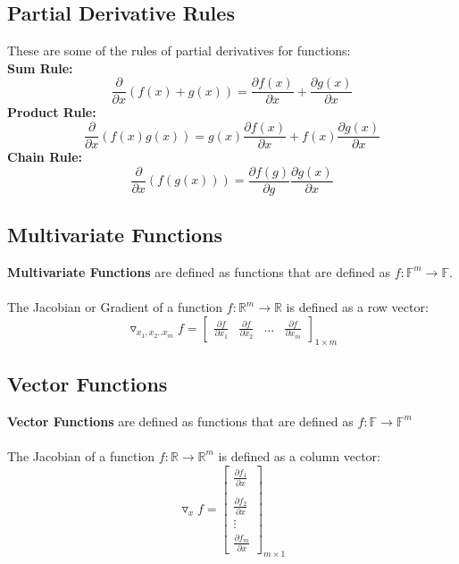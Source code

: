\documentclass[12pt, a4paper]{book}
\begin{document}
\subsection{Partial Derivative Rules}
These are some of the rules of partial derivatives for functions:\\
\textbf{Sum Rule:}
$$\frac{\partial}{\partial x}(f(x) + g(x)) = \frac{\partial f(x)}{\partial x} + \frac{\partial g(x)}{\partial x}$$
\textbf{Product Rule:}
$$\frac{\partial}{\partial x}(f(x)g(x)) = g(x)\frac{\partial f(x)}{\partial x} + f(x)\frac{\partial g(x)}{\partial x}$$
\textbf{Chain Rule:}
$$\frac{\partial}{\partial x}(f(g(x))) = \frac{\partial f(g)}{\partial g}\frac{\partial g(x)}{\partial x}$$

\subsection{Multivariate Functions}
\textbf{Multivariate Functions} are defined as functions that are defined as $f: \mathbb{F}^m \to \mathbb{F}$.\\\\
The Jacobian or Gradient of a function $f: \mathbb{R}^m \to \mathbb{R}$ is defined as a row vector:
$$\triangledown_{x_1,x_2..x_m}f = \begin{bmatrix}
    \frac{\partial f}{\partial x_1} & \frac{\partial f}{\partial x_2} & \ldots & \frac{\partial f}{\partial x_m}
\end{bmatrix}_{1 \times m}$$

\subsection{Vector Functions}
\textbf{Vector Functions} are defined as functions that are defined as $f: \mathbb{F} \to \mathbb{F}^m$\\\\
The Jacobian of a function $f: \mathbb{R} \to \mathbb{R}^m$ is defined as a column vector:
$$\triangledown_xf = \begin{bmatrix}
    \frac{\partial f_1}{\partial x}\\\\
    \frac{\partial f_2}{\partial x}\\
    \vdots\\
    \frac{\partial f_m}{\partial x}
\end{bmatrix}_{m \times 1}$$
\end{document}

